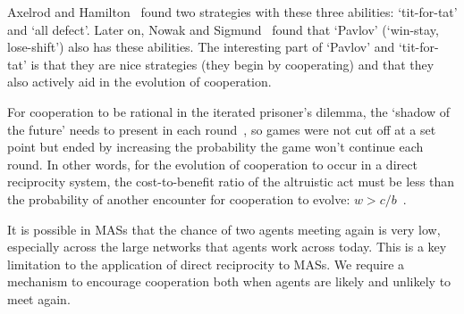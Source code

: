 \documentclass[]{final_report}
\begin{document}
Axelrod and Hamilton~\cite{evolution_of_cooperation} found two strategies with these three abilities: `tit-for-tat' and `all defect'. Later on, Nowak and Sigmund~\cite{nowak-1993a} found that `Pavlov' (`win-stay, lose-shift') also has these abilities. The interesting part of `Pavlov' and `tit-for-tat' is that they are nice strategies (they begin by cooperating) and that they also actively aid in the evolution of cooperation.\par
For cooperation to be rational in the iterated prisoner's dilemma, the `shadow of the future' needs to present in each round~\cite{wooldridge2009introduction}, so games were not cut off at a set point but ended by increasing the probability the game won't continue each round. In other words, for the evolution of cooperation to occur in a direct reciprocity system, the cost-to-benefit ratio of the altruistic act must be less than the probability of another encounter for cooperation to evolve: $w>c/b$~\cite{five_rules_coop}.\par 
It is possible in MASs that the chance of two agents meeting again is very low, especially across the large networks that agents work across today. This is a key limitation to the application of direct reciprocity to MASs. We require a mechanism to encourage cooperation both when agents are likely and unlikely to meet again.
\end{document}
